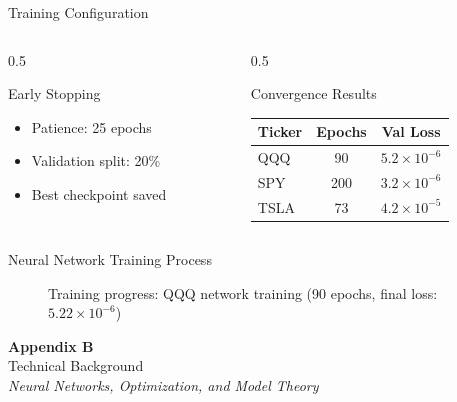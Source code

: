 \documentclass{beamer}
\begin{document}
\begin{frame}{Training Configuration}
    \begin{columns}
        \begin{column}{0.5\textwidth}
            \begin{block}{Early Stopping}
                \begin{itemize}
                    \item Patience: 25 epochs
                    \item Validation split: 20\%
                    \item Best checkpoint saved
                \end{itemize}
            \end{block}
        \end{column}
        \begin{column}{0.5\textwidth}
            \begin{block}{Convergence Results}
                \small
                \begin{tabular}{lcc}
                    \toprule
                    \textbf{Ticker} & \textbf{Epochs} & \textbf{Val Loss} \\
                    \midrule
                    QQQ & 90 & $5.2 \times 10^{-6}$ \\
                    SPY & 200 & $3.2 \times 10^{-6}$ \\
                    TSLA & 73 & $4.2 \times 10^{-5}$ \\
                    \bottomrule
                \end{tabular}
            \end{block}
        \end{column}
    \end{columns}
\end{frame}

\begin{frame}{Neural Network Training Process}
    \begin{figure}
        \centering
        \caption{Training progress: QQQ network training (90 epochs, final loss: $5.22 \times 10^{-6}$)}
    \end{figure}
\end{frame}

\begin{frame}
    \begin{center}
        \vspace{2cm}
        {\LARGE \textbf{Appendix B}}\\[0.5cm]
        {\Large Technical Background}\\[1cm]
        \textit{Neural Networks, Optimization, and Model Theory}
    \end{center}
\end{frame}
\end{document}
